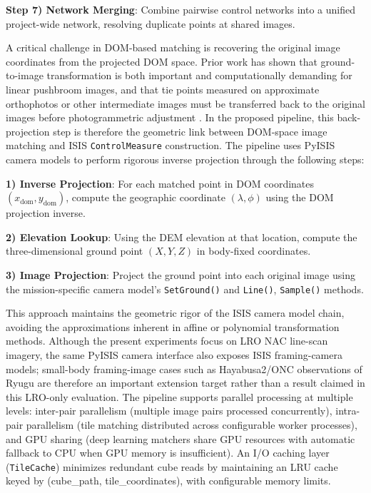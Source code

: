 \documentclass[lettersize,journal]{IEEEtran}
\newcommand{\pyisis}{PyISIS}
\begin{document}
\textbf{Step 7) Network Merging}: Combine pairwise control networks into a unified project-wide network, resolving duplicate points at shared images.

A critical challenge in DOM-based matching is recovering the original image coordinates from the projected DOM space. Prior work has shown that ground-to-image transformation is both important and computationally demanding for linear pushbroom images, and that tie points measured on approximate orthophotos or other intermediate images must be transferred back to the original images before photogrammetric adjustment \cite{geng2019groundtoimage,geng2020genericpushbroom}. In the proposed pipeline, this back-projection step is therefore the geometric link between DOM-space image matching and ISIS \texttt{ControlMeasure} construction. The pipeline uses \pyisis{} camera models to perform rigorous inverse projection through the following steps:

\textbf{1) Inverse Projection}: For each matched point in DOM coordinates $(x_{\text{dom}}, y_{\text{dom}})$, compute the geographic coordinate $(\lambda, \phi)$ using the DOM projection inverse.

\textbf{2) Elevation Lookup}: Using the DEM elevation at that location, compute the three-dimensional ground point $(X, Y, Z)$ in body-fixed coordinates.

\textbf{3) Image Projection}: Project the ground point into each original image using the mission-specific camera model's \texttt{SetGround()} and \texttt{Line()}, \texttt{Sample()} methods.

This approach maintains the geometric rigor of the ISIS camera model chain, avoiding the approximations inherent in affine or polynomial transformation methods. Although the present experiments focus on LRO NAC line-scan imagery, the same \pyisis{} camera interface also exposes ISIS framing-camera models; small-body framing-image cases such as Hayabusa2/ONC observations of Ryugu are therefore an important extension target rather than a result claimed in this LRO-only evaluation. The pipeline supports parallel processing at multiple levels: inter-pair parallelism (multiple image pairs processed concurrently), intra-pair parallelism (tile matching distributed across configurable worker processes), and GPU sharing (deep learning matchers share GPU resources with automatic fallback to CPU when GPU memory is insufficient). An I/O caching layer (\texttt{TileCache}) minimizes redundant cube reads by maintaining an LRU cache keyed by (cube\_path, tile\_coordinates), with configurable memory limits.
\end{document}
